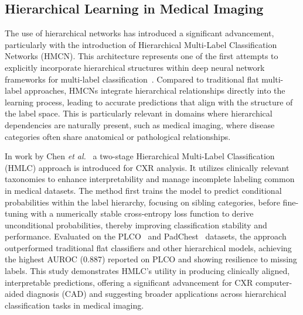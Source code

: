 \subsection{Hierarchical Learning in Medical Imaging}
The use of hierarchical networks has introduced a significant advancement, particularly with the introduction of Hierarchical Multi-Label Classification Networks (HMCN). This architecture represents one of the first attempts to explicitly incorporate hierarchical structures within deep neural network frameworks for multi-label classification~\cite{Wehrmann2018Hierarchical}. Compared to traditional flat multi-label approaches, HMCNs integrate hierarchical relationships directly into the learning process, leading to accurate predictions that align with the structure of the label space. This is particularly relevant in domains where hierarchical dependencies are naturally present, such as medical imaging, where disease categories often share anatomical or pathological relationships.

In work by Chen \textit{et al.}~\cite{Chen2020hierarchical} a two-stage Hierarchical Multi-Label Classification (HMLC) approach is introduced for CXR analysis. It utilizes clinically relevant taxonomies to enhance interpretability and manage incomplete labeling common in medical datasets. The method first trains the model to predict conditional probabilities within the label hierarchy, focusing on sibling categories, before fine-tuning with a numerically stable cross-entropy loss function to derive unconditional probabilities, thereby improving classification stability and performance. Evaluated on the PLCO~\cite{Aberle2000plco} and PadChest~\cite{padchest2020} datasets, the approach outperformed traditional flat classifiers and other hierarchical models, achieving the highest AUROC (0.887) reported on PLCO and showing resilience to missing labels. This study demonstrates HMLC’s utility in producing clinically aligned, interpretable predictions, offering a significant advancement for CXR computer-aided diagnosis (CAD) and suggesting broader applications across hierarchical classification tasks in medical imaging.

